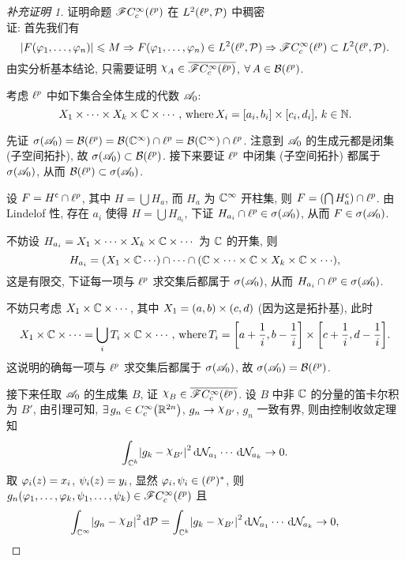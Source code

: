 \begin{proof}[补充证明 1]
证明命题 $\SF\cci\xk{\lp}$ 在 $L^2\xk{\lp,\PP}$ 中稠密\\
证: 首先我们有
\[\jd{F\xk{\phi_1,\dots,\phi_n}}\leq M\Rightarrow F\xk{\phi_1,\dots,\phi_n}\in L^2\xk{\lp,\PP}\Rightarrow \SF\cci\xk{\lp}\subset L^2\xk{\lp,\PP}.\]
由实分析基本结论, 只需要证明 $\rchi_{A}\in\mean{\SF\cci\xk{\lp}}$, $\forall A\in\BB\xk{\lp}$.\par 
考虑 $\ell^p$ 中如下集合全体生成的代数 $\mathscr{A}_{0}$:
\[X_1\times\cdots\times X_k\times\cc\times\cdots,\,\text{where}\,X_i=\zk{a_i,b_i}\times\zk{c_i,d_i},\,k\in\nn.\]

先证 $\sigma\xk{\SA_{0}}=\BB\xk{\lp}=\BB\xk{\cc^{\infty}}\cap\lp=\BB\xk{\cc^{\infty}}\cap\lp$. 注意到 $\mathscr{A}_0$ 的生成元都是闭集 (子空间拓扑), 故 $\sigma\xk{\SA_0}\subset\BB\xk{\lp}$. 接下来要证 $\ell^p$ 中闭集 (子空间拓扑) 都属于 $\sigma\xk{\SA_{0}}$, 从而 $\BB\xk{\lp}\subset\sigma\xk{\SA_{0}}$.\par 
设 $F=H^{\mathsf{c}}\cap\ell^p$, 其中 $H=\bigcup H_a$, 而 $H_a$ 为 $\mathbb{C}^{\infty}$ 开柱集, 则 $F=\left(\bigcap H_a^{\mathsf{c}}\right)\cap\ell^p$. 由 Lindelof 性, 存在 $a_i$ 使得 $H=\bigcup H_{a_{i}}$, 下证 $H_{a_{i}}\cap\lp\in\sigma\xk{\SA_{0}}$, 从而 $F\in\sigma\xk{\SA_{0}}$.\par 
不妨设 $H_{a_{i}}=X_1\times \cdots\times X_k\times\mathbb{C}\times\cdots$ 为 $\mathbb{C}$ 的开集, 则
\[H_{a_{i}}=\xk{X_{1}\times\cc\cdots}\cap\cdots\cap\xk{\cc\times\cdots\times\cc\times X_{k}\times\cc\times\cdots},\]
这是有限交, 下证每一项与 $\ell^p$ 求交集后都属于 $\sigma\xk{\SA_{0}}$, 从而 $H_{a_{i}}\cap\lp\in\sigma\xk{\SA_{0}}$.\par 
不妨只考虑 $X_{1}\times\mathbb{C}\times\cdots$, 其中 $X_{1}=\left(a,b\right)\times\left(c,d\right)$ (因为这是拓扑基), 此时
\[X_{1}\times\cc\times\cdots=\bigcup_{i}T_{i}\times\cc\times\cdots,\,\text{where}\,T_{i}=\zk{a+\frac{1}{i},b-\frac{1}{i}}\times\zk{c+\frac{1}{i},d-\frac{1}{i}}.\]
这说明的确每一项与 $\ell^p$ 求交集后都属于 $\sigma\xk{\SA_{0}}$, 故 $\sigma\xk{\SA_{0}}=\BB\xk{\lp}$.\par 
接下来任取 $\mathscr{A}_{0}$ 的生成集 $B$, 证 $\rchi_{B}\in\mean{\SF\cci\xk{\lp}}$. 设 $B$ 中非 $\mathbb{C}$ 的分量的笛卡尔积为 $B'$, 由引理可知, $\exists g_n\in\cci\xk{\rr^{2n}}$, $g_{n}\to\rchi_{B'}$, $g_{n}$ 一致有界, 则由控制收敛定理知
\[\int_{\cc^{k}}\jd{g_{k}-\rchi_{B'}}^{2}\dd\NN_{a_{1}}\cdots\dd\NN_{a_{k}}\to 0.\]
取 $\phi_{i}\xk{z}=x_{i}$, $\psi_{i}\xk{z}=y_{i}$, 显然 $\varphi_{i},\psi_{i}\in(\ell^p)^*$, 则 $g_{n}\xk{\phi_{1},\dots,\phi_{k},\psi_{1},\dots,\psi_{k}}\in\SF\cci\xk{\lp}$ 且
\[\int_{\cc^{\infty}}\jd{g_{n}-\rchi_{B}}^{2}\dd\PP=\int_{\cc^{k}}\jd{g_{k}-\rchi_{B'}}^{2}\dd\NN_{a_{1}}\cdots\dd\NN_{a_{k}}\to 0,\]

\end{proof}
